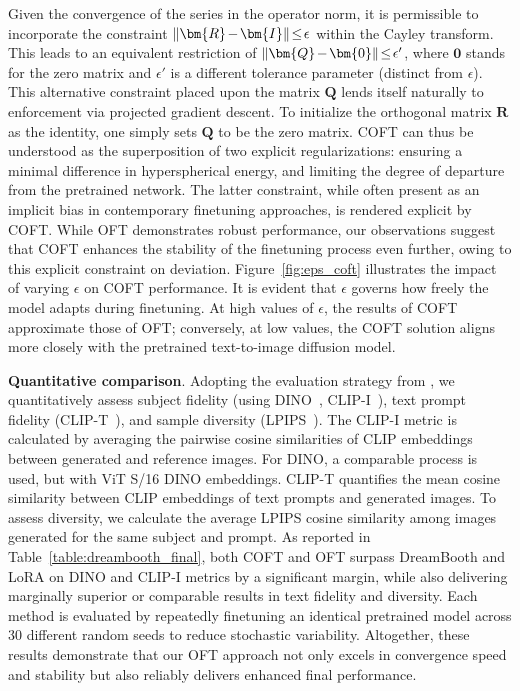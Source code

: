 \begin{itemize}[leftmargin=*,nosep]
Given the convergence of the series in the operator norm, it is permissible to incorporate the constraint $\thickmuskip=2mu \medmuskip=2mu\|\bm{R}-\bm{I}\|\leq\epsilon$ within the Cayley transform. This leads to an equivalent restriction of $\thickmuskip=2mu \medmuskip=2mu\|\bm{Q}-\bm{0}\|\leq\epsilon'$, where $\bm{0}$ stands for the zero matrix and $\epsilon'$ is a different tolerance parameter (distinct from $\epsilon$). This alternative constraint placed upon the matrix $\bm{Q}$ lends itself naturally to enforcement via projected gradient descent. To initialize the orthogonal matrix $\bm{R}$ as the identity, one simply sets $\bm{Q}$ to be the zero matrix. COFT can thus be understood as the superposition of two explicit regularizations: ensuring a minimal difference in hyperspherical energy, and limiting the degree of departure from the pretrained network. The latter constraint, while often present as an implicit bias in contemporary finetuning approaches, is rendered explicit by COFT. While OFT demonstrates robust performance, our observations suggest that COFT enhances the stability of the finetuning process even further, owing to this explicit constraint on deviation. Figure~\ref{fig:eps_coft} illustrates the impact of varying $\epsilon$ on COFT performance. It is evident that $\epsilon$ governs how freely the model adapts during finetuning. At high values of $\epsilon$, the results of COFT approximate those of OFT; conversely, at low values, the COFT solution aligns more closely with the pretrained text-to-image diffusion model.

\textbf{Quantitative comparison}. Adopting the evaluation strategy from \cite{ruiz2023dreambooth}, we quantitatively assess subject fidelity (using DINO~\cite{caron2021emerging}, CLIP-I~\cite{radford2021learning}), text prompt fidelity (CLIP-T~\cite{radford2021learning}), and sample diversity (LPIPS~\cite{zhang2018unreasonable}). The CLIP-I metric is calculated by averaging the pairwise cosine similarities of CLIP embeddings between generated and reference images. For DINO, a comparable process is used, but with ViT S/16 DINO embeddings. CLIP-T quantifies the mean cosine similarity between CLIP embeddings of text prompts and generated images. To assess diversity, we calculate the average LPIPS cosine similarity among images generated for the same subject and prompt. As reported in Table~\ref{table:dreambooth_final}, both COFT and OFT surpass DreamBooth and LoRA on DINO and CLIP-I metrics by a significant margin, while also delivering marginally superior or comparable results in text fidelity and diversity. Each method is evaluated by repeatedly finetuning an identical pretrained model across 30 different random seeds to reduce stochastic variability. Altogether, these results demonstrate that our OFT approach not only excels in convergence speed and stability but also reliably delivers enhanced final performance.


\end{itemize}
